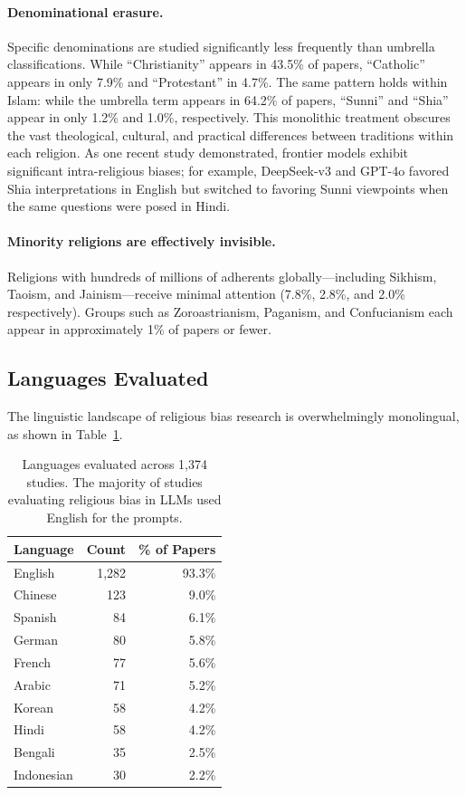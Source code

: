 \documentclass[]{fairmeta}
\begin{document}
\paragraph{Denominational erasure.} Specific denominations are studied significantly less frequently than umbrella classifications. While ``Christianity'' appears in 43.5\% of papers, ``Catholic'' appears in only 7.9\% and ``Protestant'' in 4.7\%. The same pattern holds within Islam: while the umbrella term appears in 64.2\% of papers, ``Sunni'' and ``Shia'' appear in only 1.2\% and 1.0\%, respectively. This monolithic treatment obscures the vast theological, cultural, and practical differences between traditions within each religion. As one recent study \citep{maheshwari2026} demonstrated, frontier models exhibit significant intra-religious biases; for example, DeepSeek-v3 and GPT-4o favored Shia interpretations in English but switched to favoring Sunni viewpoints when the same questions were posed in Hindi.

\paragraph{Minority religions are effectively invisible.} Religions with hundreds of millions of adherents globally---including Sikhism, Taoism, and Jainism---receive minimal attention (7.8\%, 2.8\%, and 2.0\% respectively). Groups such as Zoroastrianism, Paganism, and Confucianism each appear in approximately 1\% of papers or fewer.

\subsection{Languages Evaluated}

The linguistic landscape of religious bias research is overwhelmingly monolingual, as shown in Table~\ref{tab:languages}.

\begin{table}[htbp]
\centering
\caption{Languages evaluated across 1,374 studies. The majority of studies evaluating religious bias in LLMs used English for the prompts.}
\label{tab:languages}
\begin{tabular}{lrr}
\toprule
\textbf{Language} & \textbf{Count} & \textbf{\% of Papers} \\
\midrule
English & 1,282 & 93.3\% \\
Chinese & 123 & 9.0\% \\
Spanish & 84 & 6.1\% \\
German & 80 & 5.8\% \\
French & 77 & 5.6\% \\
Arabic & 71 & 5.2\% \\
Korean & 58 & 4.2\% \\
Hindi & 58 & 4.2\% \\
Bengali & 35 & 2.5\% \\
Indonesian & 30 & 2.2\% \\
\bottomrule
\end{tabular}
\end{table}
\end{document}
